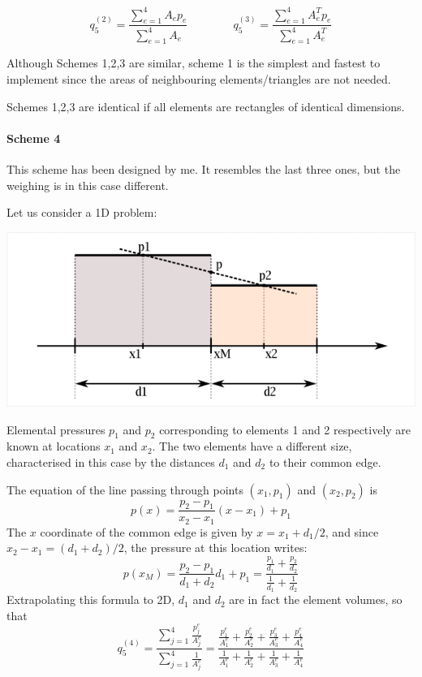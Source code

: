 \[
q_5^{(2)} = \frac{\sum\limits_{e=1}^4 A_e p_e}{\sum\limits_{e=1}^4 A_e}
\qquad
\qquad
q_5^{(3)} = \frac{\sum\limits_{e=1}^4 A_e^T p_e}{\sum\limits_{e=1}^4 A_e^T}
\] 


\begin{remark} Although Schemes 1,2,3 are similar, scheme 1 is the simplest and fastest
to implement since the areas of neighbouring elements/triangles are not needed.
\end{remark}

\begin{remark} 
Schemes 1,2,3 are identical if all elements are rectangles of identical dimensions.
\end{remark}




\paragraph{Scheme 4} This scheme has been designed by me. 
It resembles the last three ones, but the weighing is in this case different.

Let us consider a 1D problem:
\begin{center}
\includegraphics[width=0.5\linewidth]{images/pressure_smoothing/newalgo.png}
\end{center}

Elemental pressures $p_1$ and $p_2$ corresponding to elements 1 and 2 respectively are known at
locations $x_1$ and $x_2$. The two elements have a different size, characterised in this case
by the distances $d_1$ and $d_2$ to their common edge.

The equation of the line passing through points $(x_1,p_1)$ and $(x_2,p_2)$ is 
\[
p(x)=\frac{p_2-p_1}{x_2-x_1}(x-x_1)+p_1
\]
The $x$ coordinate of the common edge is given by $x=x_1+d_1/2$, 
and since $x_2-x_1=(d_1+d_2)/2$, the 
pressure at this location writes:
\[
p(x_M)= \frac{p_2-p_1}{d_1+d_2}d_1+p_1 = \frac{\frac{p_1}{d_1} + \frac{p_2}{d_2}}{\frac{1}{d_1} + \frac{1}{d_2}}
\]
Extrapolating this formula to 2D, $d_1$ and $d_2$ are in fact the element volumes, so that
\[
q_5^{(4)} = 
\frac{\sum\limits_{j=1}^4 \frac{p_j^e}{A_j^e}}{\sum\limits_{j=1}^4 \frac{1}{A_j^e}}
=
\frac{
\frac{p_1^e}{A_1^e}+
\frac{p_2^e}{A_2^e}+
\frac{p_3^e}{A_3^e}+
\frac{p_4^e}{A_4^e}
}{
\frac{1}{A_1^e}+
\frac{1}{A_2^e}+
\frac{1}{A_3^e}+
\frac{1}{A_4^e}
}\]


